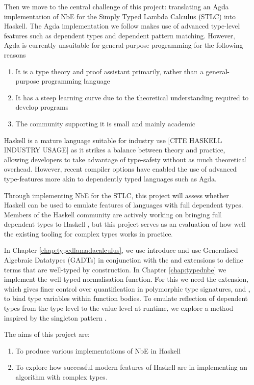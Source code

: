 Then we move to the central challenge of this project: translating an Agda implementation of NbE for the Simply Typed Lambda Calculus (STLC) into Haskell. The Agda implementation we follow makes use of advanced type-level features such as dependent types and dependent pattern matching. However, Agda is currently unsuitable for general-purpose programming for the following reasons

\begin{enumerate}
    \item It is a type theory and proof assistant primarily, rather than a general-purpose programming language
    \item It has a steep learning curve due to the theoretical understanding required to develop programs
    \item The community supporting it is small and mainly academic
\end{enumerate}

Haskell is a mature language suitable for industry use [CITE HASKELL INDUSTRY USAGE] as it strikes a balance between theory and practice, allowing developers to take advantage of type-safety without as much theoretical overhead. However, recent compiler options have enabled the use of advanced type-features more akin to dependently typed languages such as Agda. 

Through implementing NbE for the STLC, this project will assess whether Haskell can be used to emulate features of languages with full dependent types. Members of the Haskell community are actively working on bringing full dependent types to Haskell \cite{DH}, but this project serves as an evaluation of how well the existing tooling for complex types works in practice.

In Chapter \ref{chap:typedlamadacalculus}, we use introduce and use Generalised Algebraic Datatypes (GADTs) in conjunction with the  and  extensions to define terms that are well-typed by construction. 
In Chapter \ref{chap:typednbe} we implement the well-typed normalisation function. For this we need the  extension, which gives finer control over quantification in polymorphic type signatures, and , to bind type variables within function bodies. To emulate reflection of dependent types from the type level to the value level at runtime, we explore a method inspired by the singleton pattern \cite{singletons}.

The aims of this project are:
\begin{enumerate}
    \item To produce various implementations of NbE in Haskell
    \item To explore how successful modern features of Haskell are in implementing an algorithm with complex types.
\end{enumerate}